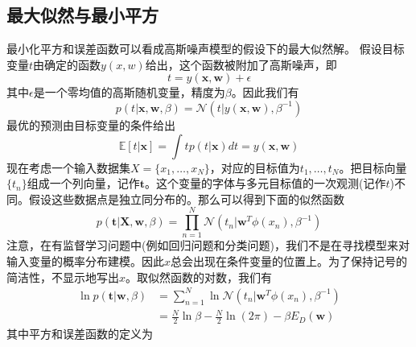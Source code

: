 \subsection*{最大似然与最小平方}
最小化平方和误差函数可以看成高斯噪声模型的假设下的最大似然解。
假设目标变量$t$由确定的函数$y(x,w)$给出，这个函数被附加了高斯噪声，即
\begin{equation}
	t=y(\boldsymbol{x},\boldsymbol{w})+\epsilon
\end{equation}
其中$\epsilon$是一个零均值的高斯随机变量，精度为$\beta$。因此我们有 
\begin{equation}
	p(t|\boldsymbol{x},\boldsymbol{w},\beta)=\mathcal{N}(t|y(\boldsymbol{x},\boldsymbol{w}),\beta^{-1})
\end{equation}
最优的预测由目标变量的条件给出
\begin{equation}
	\mathbb{E}[t|\boldsymbol{x}]=\int tp(t|\boldsymbol{x})dt = y(\boldsymbol{x},\boldsymbol{w})
\end{equation}
现在考虑一个输入数据集$X=\{x_1,\dots,x_N \}$，对应的目标值为$t_1,\dots,t_N$。把目标向量$\{t_n\}$组成一个列向量，记作$\textbf{t}$。这个变量的字体与多元目标值的一次观测(记作$t$)不同。假设这些数据点是独立同分布的。那么可以得到下面的似然函数
\begin{equation}
	p(\boldsymbol{t}|\boldsymbol{X},\boldsymbol{w},\beta)=\prod_{n=1}^{N}\mathcal{N}(t_n|\boldsymbol{w}^T\phi(x_n),\beta^{-1})
\end{equation}
注意，在有监督学习问题中(例如回归问题和分类问题)，我们不是在寻找模型来对输入变量的概率分布建模。因此$x$总会出现在条件变量的位置上。为了保持记号的简洁性，不显示地写出$x$。取似然函数的对数，我们有
\begin{equation}
	\begin{aligned}
	\ln p(\boldsymbol{t}|\boldsymbol{w},\beta)&=\sum_{n=1}^{N}\ln \mathcal{N}(t_n|\boldsymbol{w}^T\phi(x_n),\beta^{-1})\\
	&=\frac{N}{2}\ln \beta -\frac{N}{2}\ln (2\pi) -\beta E_D(\boldsymbol{w})
	\end{aligned}
\end{equation}
其中平方和误差函数的定义为
